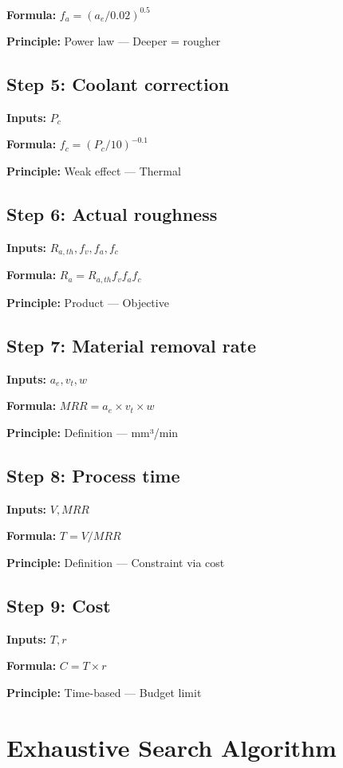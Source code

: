 \documentclass[11pt,twocolumn]{article}
\begin{document}
\textbf{Formula:} $f_a = (a_e/0.02)^{0.5}$

\textbf{Principle:} Power law --- Deeper = rougher

\subsection*{Step 5: Coolant correction}
\textbf{Inputs:} $P_c$

\textbf{Formula:} $f_c = (P_c/10)^{-0.1}$

\textbf{Principle:} Weak effect --- Thermal

\subsection*{Step 6: Actual roughness}
\textbf{Inputs:} $R_{a,th}, f_v, f_a, f_c$

\textbf{Formula:} $R_a = R_{a,th} f_v f_a f_c$

\textbf{Principle:} Product --- Objective

\subsection*{Step 7: Material removal rate}
\textbf{Inputs:} $a_e, v_t, w$

\textbf{Formula:} $MRR = a_e \times v_t \times w$

\textbf{Principle:} Definition --- mm³/min

\subsection*{Step 8: Process time}
\textbf{Inputs:} $V, MRR$

\textbf{Formula:} $T = V/MRR$

\textbf{Principle:} Definition --- Constraint via cost

\subsection*{Step 9: Cost}
\textbf{Inputs:} $T, r$

\textbf{Formula:} $C = T \times r$

\textbf{Principle:} Time-based --- Budget limit


\section{Exhaustive Search Algorithm}
\end{document}
